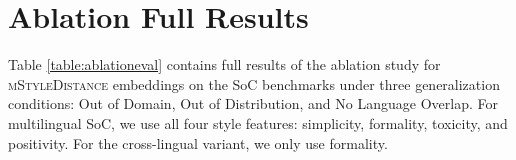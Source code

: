 \section{Ablation Full Results}

Table \ref{table:ablationeval} contains full results of the ablation study for \textsc{mStyleDistance} embeddings on the SoC benchmarks under three generalization conditions: Out of Domain, Out of Distribution, and No Language Overlap. For multilingual SoC, we use all four style features: simplicity, formality, toxicity, and positivity. For the cross-lingual variant, we only use formality.

\label{sec:appendix:ablationfull}

